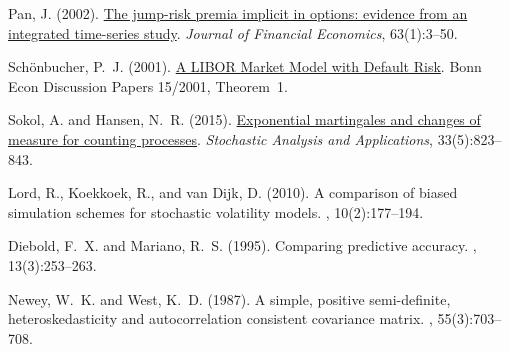 \begin{thebibliography}{}
Pan, J. (2002). \href{https://doi.org/10.1016/S0304-405X(01)00088-5}{The jump-risk premia implicit in options: evidence from an integrated time-series study}. {\em Journal of Financial Economics}, 63(1):3--50.

Sch\"onbucher, P.~J. (2001). \href{https://www.econstor.eu/bitstream/10419/78414/1/bgse15_2001.pdf}{A LIBOR Market Model with Default Risk}. Bonn Econ Discussion Papers 15/2001, Theorem~1.

Sokol, A. and Hansen, N.~R. (2015). \href{https://doi.org/10.1080/07362994.2015.1040890}{Exponential martingales and changes of measure for counting processes}. {\em Stochastic Analysis and Applications}, 33(5):823--843.

Lord, R., Koekkoek, R., and van Dijk, D. (2010).
\newblock A comparison of biased simulation schemes for stochastic volatility
  models.
, 10(2):177--194.

Diebold, F.~X. and Mariano, R.~S. (1995).
\newblock Comparing predictive accuracy.
, 13(3):253--263.

Newey, W.~K. and West, K.~D. (1987).
\newblock A simple, positive semi-definite, heteroskedasticity and
  autocorrelation consistent covariance matrix.
, 55(3):703--708.

\end{thebibliography}
